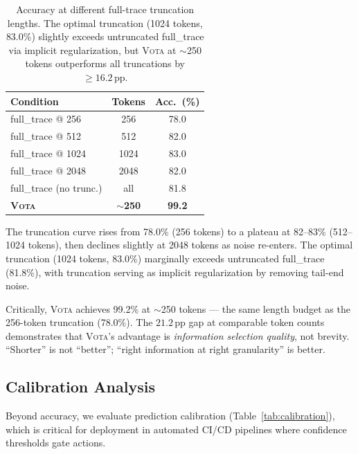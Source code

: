 \documentclass[11pt,a4paper]{article}
\newcommand{\vota}{\textsc{Vota}}
\newcommand{\pp}{\,\text{pp}}
\begin{document}
\begin{table}[t]
\centering
\small
\begin{tabular}{lcc}
\toprule
\textbf{Condition} & \textbf{Tokens} & \textbf{Acc.\ (\%)} \\
\midrule
full\_trace @ 256 & 256 & 78.0 \\
full\_trace @ 512 & 512 & 82.0 \\
full\_trace @ 1024 & 1024 & 83.0 \\
full\_trace @ 2048 & 2048 & 82.0 \\
full\_trace (no trunc.) & all & 81.8 \\
\midrule
\textbf{\vota{}} & \textbf{$\sim$250} & \textbf{99.2} \\
\bottomrule
\end{tabular}
\caption{Accuracy at different full-trace truncation lengths. The optimal truncation (1024 tokens, 83.0\%) slightly exceeds untruncated full\_trace via implicit regularization, but \vota{} at $\sim$250 tokens outperforms all truncations by $\geq 16.2\pp$.}
\label{tab:length}
\end{table}

The truncation curve rises from 78.0\% (256 tokens) to a plateau at 82--83\% (512--1024 tokens), then declines slightly at 2048 tokens as noise re-enters.
The optimal truncation (1024 tokens, 83.0\%) marginally exceeds untruncated full\_trace (81.8\%), with truncation serving as implicit regularization by removing tail-end noise.

Critically, \vota{} achieves 99.2\% at $\sim$250 tokens --- the same length budget as the 256-token truncation (78.0\%).
The $21.2\pp$ gap at comparable token counts demonstrates that \vota{}'s advantage is \emph{information selection quality}, not brevity.
``Shorter'' is not ``better''; ``right information at right granularity'' is better.

\subsection{Calibration Analysis}
\label{sec:calibration}

Beyond accuracy, we evaluate prediction calibration (Table~\ref{tab:calibration}), which is critical for deployment in automated CI/CD pipelines where confidence thresholds gate actions.
\end{document}
